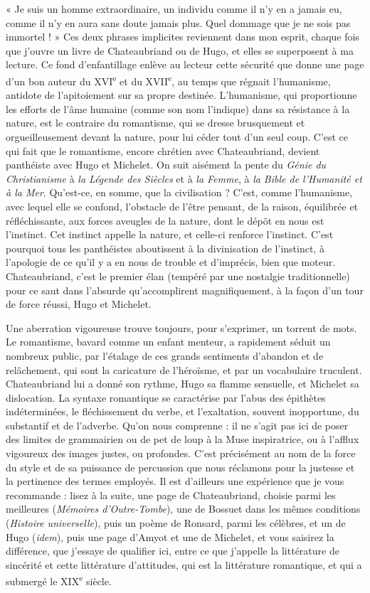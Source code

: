 \documentclass[french,twoside]{book} %
\begin{document}
« Je suis un homme extraordinaire, un individu comme il n’y en a jamais eu, comme il n’y en aura sans doute jamais plus. Quel dommage que je ne sois pas immortel ! » Ces deux phrases implicites reviennent dans mon esprit, chaque fois que j’ouvre un livre de Chateaubriand ou de Hugo, et elles se superposent à ma lecture. Ce fond d’enfantillage enlève au lecteur cette sécurité que donne une page d’un bon auteur du XVI\textsuperscript{e} et du XVII\textsuperscript{e}, au temps que régnait l’humanisme, antidote de l’apitoiement sur sa propre destinée. L’humanisme, qui proportionne les efforts de l’âme humaine (comme son nom l’indique) dans sa résistance à la nature, est le contraire du romantisme, qui se dresse brusquement et orgueilleusement devant la nature, pour lui céder tout d’un seul coup. C’est ce qui fait que le romantisme, encore chrétien avec Chateaubriand, devient panthéiste avec Hugo et Michelet. On suit aisément la pente du {\itshape Génie du Christianisme} à {\itshape la Légende des Siècles} et à {\itshape la Femme}, à {\itshape la Bible de l’Humanité et à la Mer}. Qu’est-ce, en somme, que la civilisation ? C’est, comme l’humanisme, avec lequel elle se confond, l’obstacle de l’être pensant, de la raison, équilibrée et réfléchissante, aux forces aveugles de la nature, dont le dépôt en nous est l’instinct. Cet instinct appelle la nature, et celle-ci renforce l’instinct. C’est pourquoi tous les panthéistes aboutissent à la divinisation de l’instinct, à l’apologie de ce qu’il y a en nous de trouble et d’imprécis, bien que moteur. Chateaubriand, c’est le premier élan (tempéré par une nostalgie traditionnelle) pour ce saut dans l’absurde qu’accomplirent magnifiquement, à la façon d’un tour de force réussi, Hugo et Michelet.\par
Une aberration vigoureuse trouve toujours, pour s’exprimer, un torrent de mots. Le romantisme, bavard comme un enfant menteur, a rapidement séduit un nombreux public, par l’étalage de ces grands sentiments d’abandon et de relâchement, qui sont la caricature de l’héroïsme, et par un vocabulaire truculent. Chateaubriand lui a donné son rythme, Hugo sa flamme sensuelle, et Michelet sa dislocation. La syntaxe romantique se caractérise par l’abus des épithètes indéterminées, le fléchissement du verbe, et l’exaltation, souvent inopportune, du substantif et de l’adverbe. Qu’on nous comprenne : il ne s’agit pas ici de poser des limites de grammairien ou de pet de loup à la Muse inspiratrice, ou à l’afflux vigoureux des images justes, ou profondes. C’est précisément au nom de la force du style et de sa puissance de percussion que nous réclamons pour la justesse et la pertinence des termes employés. Il est d’ailleurs une expérience que je vous recommande : lisez à la suite, une page de Chateaubriand, choisie parmi les meilleures ({\itshape Mémoires d’Outre-Tombe}), une de Bossuet dans les mêmes conditions ({\itshape Histoire universelle}), puis un poème de Ronsard, parmi les célèbres, et un de Hugo ({\itshape idem}), puis une page d’Amyot et une de Michelet, et vous saisirez la différence, que j’essaye de qualifier ici, entre ce que j’appelle la littérature de sincérité et cette littérature d’attitudes, qui est la littérature romantique, et qui a submergé le XIX\textsuperscript{e} siècle.\par
\end{document}
